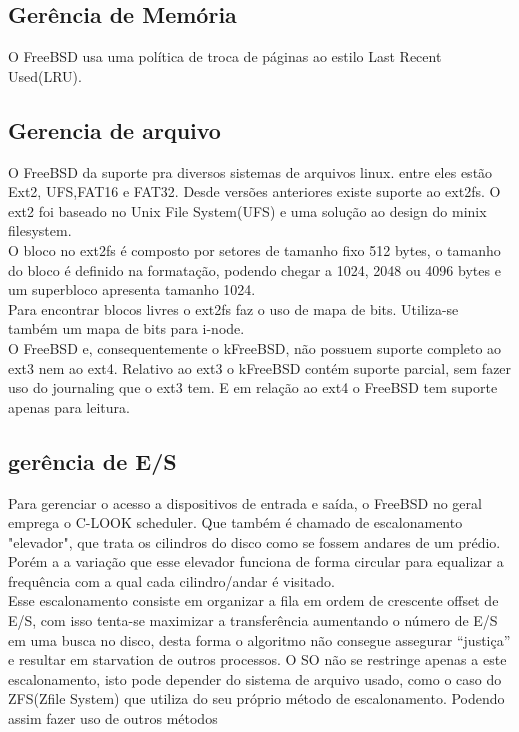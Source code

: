 \documentclass[conference]{IEEEtran}
\begin{document}
\subsection{Gerência de Memória}\label{sec:BSDMem}
O FreeBSD usa uma política de troca de páginas ao estilo Last Recent Used(LRU).\cite{FreeBsdArc}

\subsection{Gerencia de arquivo}\label{sec:BSDArquivo}
O FreeBSD da suporte pra diversos sistemas de arquivos linux. entre eles estão Ext2, UFS,FAT16 e FAT32. Desde versões anteriores existe suporte ao ext2fs. O ext2 foi baseado no Unix File System(UFS) e uma solução ao design do minix filesystem.\\

O bloco no ext2fs é composto por setores de tamanho fixo 512 bytes, o tamanho do bloco é definido na formatação, podendo chegar a 1024, 2048 ou 4096 bytes e um superbloco apresenta tamanho 1024. \\ 
Para encontrar blocos livres o ext2fs faz o uso de mapa de bits. Utiliza-se também um mapa de bits para i-node.\\ 

O FreeBSD e, consequentemente o kFreeBSD, não possuem suporte completo ao ext3 nem ao ext4. Relativo ao ext3 o kFreeBSD contém suporte parcial, sem fazer uso do journaling que o ext3 tem. E em relação ao ext4 o FreeBSD tem suporte apenas para leitura.\cite{kFreeBSD-ext4}\\

\subsection{gerência de E/S}\label{sec:BSDES}
Para gerenciar o acesso a dispositivos de entrada e saída, o FreeBSD no geral emprega o C-LOOK scheduler\cite{FreeBSD-Hybrid}. Que também é chamado de escalonamento "elevador", que trata os cilindros do disco como se fossem andares de um prédio. Porém a a variação que esse elevador funciona de forma circular para equalizar a frequência com a qual cada cilindro/andar é visitado.\\

Esse escalonamento consiste em organizar a fila em ordem de crescente offset de E/S, com isso tenta-se maximizar a transferência aumentando o número de E/S em uma busca no disco, desta forma o algoritmo não consegue assegurar “justiça” e resultar em starvation de outros processos. 
O SO não se restringe apenas a este escalonamento, isto pode depender do sistema de arquivo usado, como o caso do ZFS(Zfile System) que utiliza do seu próprio método de escalonamento. Podendo assim fazer uso de outros métodos \\
\end{document}
